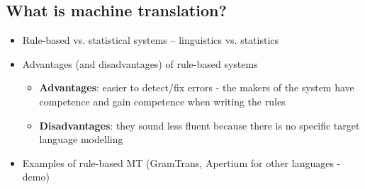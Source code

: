 \documentclass[a4paper,english,12pt]{article}
\begin{document}
\subsection{What is machine translation?}
\begin{itemize}
\item  Rule-based vs. statistical systems -- linguistics vs. statistics
\item  Advantages (and disadvantages) of rule-based systems
  \begin{itemize}
     \item {\bf Advantages}: easier to detect/fix errors - the makers of the system have competence and gain competence when writing the rules
     \item {\bf Disadvantages}: they sound less fluent because there is no specific target language modelling
  \end{itemize}
\item  Examples of rule-based MT (GramTrans, Apertium for other languages - demo)
\end{itemize}
\end{document}
